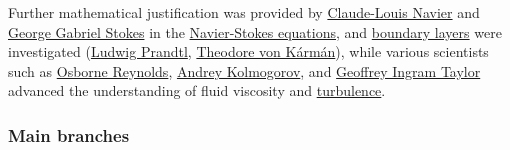 \documentclass{article}
\begin{document}
Further mathematical justification was provided by \href{https://en.wikipedia.org/wiki/Claude-Louis_Navier}{Claude-Louis Navier} and \href{https://en.wikipedia.org/wiki/George_Gabriel_Stokes}{George Gabriel Stokes} in the \href{https://en.wikipedia.org/wiki/Navier-Stokes_equations}{Navier-Stokes equations}, and \href{https://en.wikipedia.org/wiki/Boundary_layers}{boundary layers} were investigated (\href{https://en.wikipedia.org/wiki/Ludwig_Prandtl}{Ludwig Prandtl}, \href{https://en.wikipedia.org/wiki/Theodore_von_K%C3%A1rm%C3%A1n}{Theodore von Kármán}), while various scientists such as \href{https://en.wikipedia.org/wiki/Osborne_Reynolds}{Osborne Reynolds}, \href{https://en.wikipedia.org/wiki/Andrey_Kolmogorov}{Andrey Kolmogorov}, and \href{https://en.wikipedia.org/wiki/Geoffrey_Ingram_Taylor}{Geoffrey Ingram Taylor} advanced the understanding of fluid viscosity and \href{https://en.wikipedia.org/wiki/Turbulence}{turbulence}.

\subsubsection{Main branches}
\end{document}
